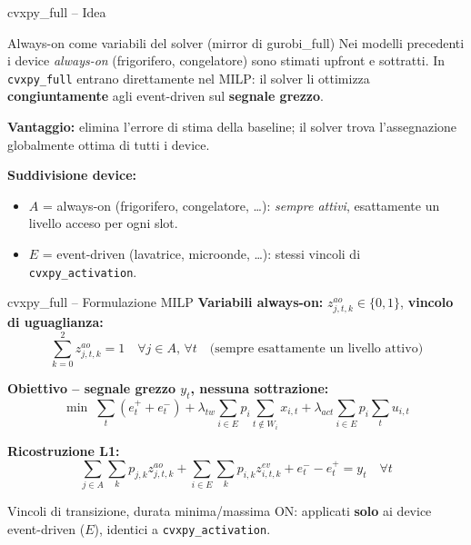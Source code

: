 \documentclass[aspectratio=169]{beamer}
\newcommand{\code}[1]{\texttt{\small #1}}
\begin{document}
\begin{frame}{cvxpy\_full -- Idea}
  \small
  \begin{block}{Always-on come variabili del solver (mirror di gurobi\_full)}
    Nei modelli precedenti i device \emph{always-on} (frigorifero, congelatore) sono
    stimati upfront e sottratti. In \code{cvxpy\_full} entrano direttamente nel MILP:
    il solver li ottimizza \textbf{congiuntamente} agli event-driven sul \textbf{segnale grezzo}.
  \end{block}

  \vspace{0.4em}
  \textbf{Vantaggio:} elimina l'errore di stima della baseline; il solver trova
  l'assegnazione globalmente ottima di tutti i device.

  \vspace{0.3em}
  \textbf{Suddivisione device:}
  \begin{itemize}
    \item $A$ = always-on (frigorifero, congelatore, \ldots): \emph{sempre attivi},
          esattamente un livello acceso per ogni slot.
    \item $E$ = event-driven (lavatrice, microonde, \ldots): stessi vincoli di
          \code{cvxpy\_activation}.
  \end{itemize}
\end{frame}

\begin{frame}{cvxpy\_full -- Formulazione MILP}
  \small
  \textbf{Variabili always-on:} $z^{ao}_{j,t,k}\in\{0,1\}$,\;
  \textbf{vincolo di uguaglianza:}
  \[
    \sum_{k=0}^{2} z^{ao}_{j,t,k} = 1 \quad \forall j\in A,\,\forall t
    \quad\text{(sempre esattamente un livello attivo)}
  \]

  \textbf{Obiettivo -- segnale grezzo $y_t$, nessuna sottrazione:}
  \[
    \min \;\sum_t (e^+_t + e^-_t)
    + \lambda_{tw} \!\!\sum_{i\in E}\!\! p_i \!\!\sum_{t\notin W_i}\!\! x_{i,t}
    + \lambda_{act} \!\!\sum_{i\in E}\!\! p_i \sum_t u_{i,t}
  \]

  \textbf{Ricostruzione L1:}
  \[
    \sum_{j\in A}\sum_k p_{j,k} z^{ao}_{j,t,k}
    + \sum_{i\in E}\sum_k p_{i,k} z^{ev}_{i,t,k}
    + e^-_t - e^+_t = y_t \quad\forall t
  \]

  Vincoli di transizione, durata minima/massima ON:
  applicati \textbf{solo} ai device event-driven ($E$), identici a \code{cvxpy\_activation}.
\end{frame}
\end{document}
